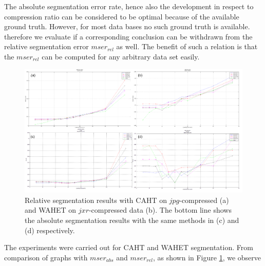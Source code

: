 \documentclass[10pt,twocolumn,letterpaper]{article}
\begin{document}
The absolute segmentation error rate, hence also the development in respect to compression ratio can be considered to be optimal because of the available ground truth. However, for most data bases no such ground truth is available. therefore we evaluate if a corresponding conclusion can be withdrawn from the relative segmentation error $mser_{rel}$ as well. The benefit of such a relation is that the $mser_{rel}$ can be computed for any arbitrary data set easily. 

\begin{figure}[h]
	\begin{center}
		
	\includegraphics[width=\linewidth]{img/segResults}
\end{center}
	\caption{Relative segmentation results with CAHT on $jpg$-compressed (a) and WAHET on $jxr$-compressed data (b). The bottom line shows the absolute segmentation results with the same methods in (c) and (d) respectively.}
	\label{fig:segResults}
	
\end{figure}

The experiments were carried out for CAHT and WAHET segmentation. From comparison of graphs with $mser_{abs}$ and $mser_{rel}$, as shown in Figure \ref{fig:segResults}, we observe
\end{document}
